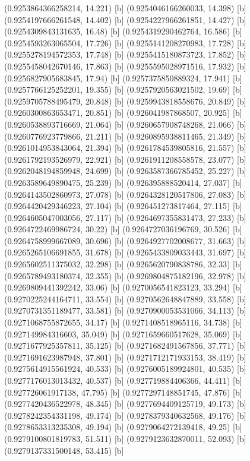 {{{(0.9253864366258214, 14.221) [b] 
(0.9254046166260033, 14.398) [b] 
(0.9254197666261548, 14.402) [b] 
(0.9254227966261851, 14.427) [b] 
(0.9254309843131635, 16.48) [b] 
(0.9254319290462764, 16.586) [b] 
(0.9254593263065504, 17.726) [b] 
(0.9255141208270983, 17.728) [b] 
(0.9255278194572353, 17.748) [b] 
(0.9255415180873723, 17.852) [b] 
(0.9255458042670146, 17.863) [b] 
(0.9255595028971516, 17.932) [b] 
(0.9256827905683845, 17.94) [b] 
(0.9257375850889324, 17.941) [b] 
(0.9257766125252201, 19.355) [b] 
(0.9257920563021502, 19.69) [b] 
(0.9259705788495479, 20.848) [b] 
(0.9259943818558676, 20.849) [b] 
(0.9260300863653471, 20.851) [b] 
(0.926041987868507, 20.925) [b] 
(0.9260538893716669, 21.064) [b] 
(0.9260657908748268, 21.066) [b] 
(0.9260776923779866, 21.211) [b] 
(0.9260895938811465, 21.349) [b] 
(0.9261014953843064, 21.394) [b] 
(0.9261784539805816, 21.557) [b] 
(0.9261792193526979, 22.921) [b] 
(0.9261911208558578, 23.077) [b] 
(0.9262048194859948, 24.699) [b] 
(0.9263587366785452, 25.227) [b] 
(0.9263589649890475, 25.239) [b] 
(0.926395888520414, 27.037) [b] 
(0.9264143502860973, 27.078) [b] 
(0.9264328120517806, 27.083) [b] 
(0.9264420429346223, 27.104) [b] 
(0.926451273817464, 27.115) [b] 
(0.9264605047003056, 27.117) [b] 
(0.9264697355831473, 27.233) [b] 
(0.9264722469986724, 30.22) [b] 
(0.9264727036196769, 30.526) [b] 
(0.9264758999667089, 30.696) [b] 
(0.9264927702008677, 31.663) [b] 
(0.9265265106691855, 31.678) [b] 
(0.9265433809033443, 31.697) [b] 
(0.9265602511375032, 32.298) [b] 
(0.9265620790838786, 32.33) [b] 
(0.9265789493180374, 32.355) [b] 
(0.9269804875182196, 32.978) [b] 
(0.9269809441392242, 33.06) [b] 
(0.9270056541823123, 33.294) [b] 
(0.9270225244164711, 33.554) [b] 
(0.9270562648847889, 33.558) [b] 
(0.9270731351189477, 33.581) [b] 
(0.9270900053531066, 34.113) [b] 
(0.9271068755872655, 34.17) [b] 
(0.9271408518965116, 34.738) [b] 
(0.927149984316603, 35.049) [b] 
(0.9271659660517628, 35.069) [b] 
(0.9271677925357811, 35.125) [b] 
(0.9271682491567856, 37.771) [b] 
(0.9271691623987948, 37.801) [b] 
(0.9271712171933153, 38.419) [b] 
(0.9275614915561924, 40.533) [b] 
(0.9276005189924801, 40.535) [b] 
(0.9277176013013432, 40.537) [b] 
(0.927719884406366, 44.411) [b] 
(0.927726061917138, 47.795) [b] 
(0.9277297148851745, 47.876) [b] 
(0.9277420436522978, 48.345) [b] 
(0.9277694409125719, 49.173) [b] 
(0.9278242354331198, 49.174) [b] 
(0.9278379340632568, 49.176) [b] 
(0.9278653313235308, 49.194) [b] 
(0.9279064272139418, 49.25) [b] 
(0.9279100801819783, 51.511) [b] 
(0.9279123632870011, 52.093) [b] 
(0.9279137331500148, 53.415) [b] 
}}}
